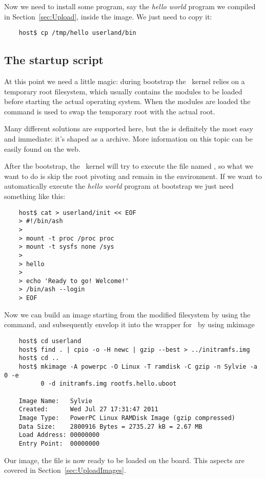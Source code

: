     Now we need to install some program, say the \emph{hello world}
    program we compiled in Section~\ref{sec:Upload}, inside the image. We
    just need to copy it:

\begin{lstlisting}
    host$ cp /tmp/hello userland/bin
\end{lstlisting}

\subsection{The startup script}

    At this point we need a little magic: during bootstrap the \Linux\
    kernel relies on a temporary root filesystem, which usually contains
    the modules to be loaded before starting the actual operating system.
    When the modules are loaded the \Command{pivot\_root} command is used
    to swap the temporary root with the actual root.

    Many different solutions are supported here, but the
     is definitely the most easy and immediate: it's
    shaped as a \StdName{gzipped cpio} archive. More information on this
    topic can be easily found on the web.

    After the bootstrap, the \Linux\ kernel will try to execute the file
    named \FileName{/init}, so what we want to do is skip the root
    pivoting and remain in the \StdName{initramfs} environment. If we want
    to automatically execute the \emph{hello world} program at bootstrap
    we just need something like this:

\begin{lstlisting}
    host$ cat > userland/init << EOF
    > #!/bin/ash
    >
    > mount -t proc /proc proc
    > mount -t sysfs none /sys
    >
    > hello
    >
    > echo 'Ready to go! Welcome!'
    > /bin/ash --login
    > EOF
\end{lstlisting}

    Now we can build an  image starting from the
    modified filesystem by using the \Command{cpio} command, and
    subsequently envelop it into the wrapper for \uBoot\ by using mkimage

\begin{lstlisting}
    host$ cd userland
    host$ find . | cpio -o -H newc | gzip --best > ../initramfs.img
    host$ cd ..
    host$ mkimage -A powerpc -O Linux -T ramdisk -C gzip -n Sylvie -a 0 -e
          0 -d initramfs.img rootfs.hello.uboot

    Image Name:   Sylvie
    Created:      Wed Jul 27 17:31:47 2011
    Image Type:   PowerPC Linux RAMDisk Image (gzip compressed)
    Data Size:    2800916 Bytes = 2735.27 kB = 2.67 MB
    Load Address: 00000000
    Entry Point:  00000000
\end{lstlisting}

    Our image, the file  is now ready to be
    loaded on the board. This aspects are covered in
    Section~\ref{sec:UploadImages}.

